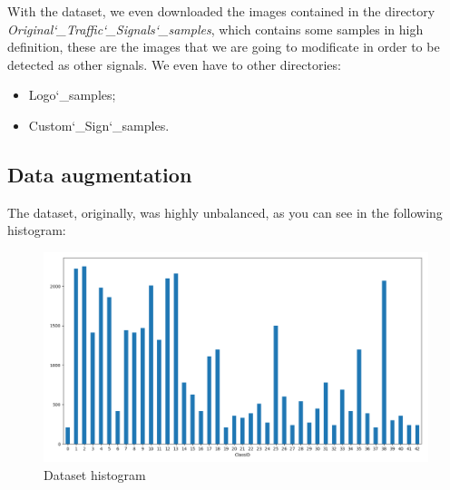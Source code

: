 \newpage
With the dataset, we even downloaded the images contained in the directory \textit{Original\char`_Traffic\char`_Signals\char`_samples}, which contains some samples in high definition, these are the images that we are going to modificate in order to be detected as other signals.
\newline
We even have to other directories:
\begin{itemize}
	\item Logo\char`_samples;
	\item Custom\char`_Sign\char`_samples.
\end{itemize}

\subsection{Data augmentation}
The dataset, originally, was highly unbalanced, as you can see in the following histogram:
\begin{figure}[!ht]
	\includegraphics[width=\linewidth]{img/histo.PNG} %
	\caption{Dataset histogram} %
\end{figure}

